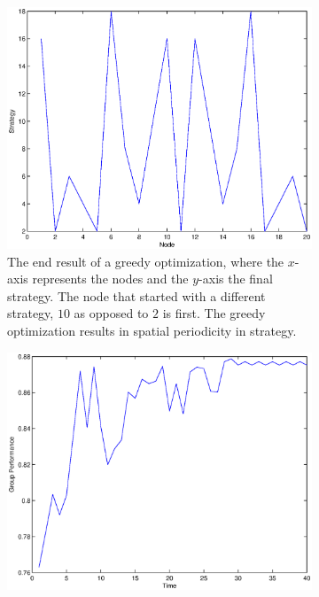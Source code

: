 \documentclass{article}
\begin{document}
\begin{figure}

\begin{subfigure}{.5 \textwidth}
\begin{center}
\includegraphics[width=\textwidth]{end_of_greedy_optimization.eps}
\end{center}
\caption{The end result of a greedy optimization, where the $x$-axis represents the nodes and the $y$-axis the final strategy.  The node that started with a different strategy, $10$ as opposed to $2$ is first.  The greedy optimization results in spatial periodicity in strategy.}
\end{subfigure}
\begin{subfigure}{.5 \textwidth}
\begin{center}
\includegraphics[width=\textwidth]{greedy_optimization_group_perf.eps}

\end{center}
\end{subfigure}
\end{figure}
\end{document}
